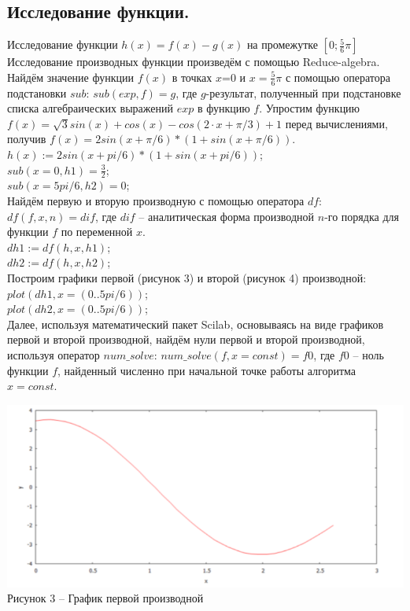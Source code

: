 \documentclass[russian, utf8, nocolumnxxxi, nocolumnxxxii, 14pt]{eskdtext}
\begin{document}
\subsection{Исследование функции.}
\indent Исследование функции  $h(x) = f(x) - g(x)$ на промежутке $[0;\frac{5}{6}\pi]$\\
Исследование производных функции произведём с помощью Reduce-algebra.\\
\indent Найдём значение функции $f(x)$ в точках $x$=0 и $x=\frac{5}{6}\pi$ с помощью оператора подстановки $sub$: $sub(exp,f)=g$, где $g$-результат, полученный при подстановке списка алгебраических выражений $exp$ в функцию $f$. Упростим функцию $f(x) = \sqrt{3}sin(x) + cos(x) - cos(2 \cdot x + \pi/3) + 1$ перед вычислениями, получив $f(x) = 2sin(x+\pi/6)*(1+sin(x+\pi/6))$.\\
$h(x):=2sin(x+pi/6)*(1+sin(x+pi/6))$;\\
$sub(x=0,h1) = \frac{3}{2}$;\\
$sub(x=5pi/6,h2) = 0$;\\
\indent Найдём первую и вторую производную с помощью оператора $df$: $df(f,x,n) = dif$, где $dif$ – аналитическая форма производной $n$-го порядка для функции $f$ по переменной $x$.\\
$dh1:=df(h,x,h1)$;\\
$dh2:=df(h,x,h2)$;\\
\indent Построим графики первой (рисунок 3) и второй (рисунок 4) производной:\\
$plot(dh1,x=(0..5pi/6))$;\\
$plot(dh2,x=(0..5pi/6))$;\\
\indent Далее, используя математический пакет Scilab, основываясь на виде графиков первой и второй производной, найдём нули первой и второй производной, используя оператор $num\_solve$: $num\_solve(f,x = const) = f0$, где $f0$ – ноль функции $f$, найденный численно при начальной точке работы алгоритма $x = const.$\\
\begin{center}
\includegraphics[scale=0.8]{JPG/drei.png}\\
Рисунок 3 -- График первой производной\\
\end{center}
\end{document}
